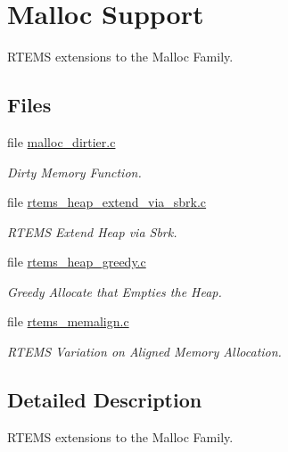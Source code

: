 \hypertarget{group__MallocSupport}{}\section{Malloc Support}
\label{group__MallocSupport}


R\+T\+E\+MS extensions to the Malloc Family.  


\subsection*{Files}
\begin{DoxyCompactItemize}
\item 
file \mbox{\hyperlink{malloc__dirtier_8c}{malloc\+\_\+dirtier.\+c}}
\begin{DoxyCompactList}\small\item\em Dirty Memory Function. \end{DoxyCompactList}\item 
file \mbox{\hyperlink{rtems__heap__extend__via__sbrk_8c}{rtems\+\_\+heap\+\_\+extend\+\_\+via\+\_\+sbrk.\+c}}
\begin{DoxyCompactList}\small\item\em R\+T\+E\+MS Extend Heap via Sbrk. \end{DoxyCompactList}\item 
file \mbox{\hyperlink{rtems__heap__greedy_8c}{rtems\+\_\+heap\+\_\+greedy.\+c}}
\begin{DoxyCompactList}\small\item\em Greedy Allocate that Empties the Heap. \end{DoxyCompactList}\item 
file \mbox{\hyperlink{rtems__memalign_8c}{rtems\+\_\+memalign.\+c}}
\begin{DoxyCompactList}\small\item\em R\+T\+E\+MS Variation on Aligned Memory Allocation. \end{DoxyCompactList}\end{DoxyCompactItemize}


\subsection{Detailed Description}
R\+T\+E\+MS extensions to the Malloc Family. 

